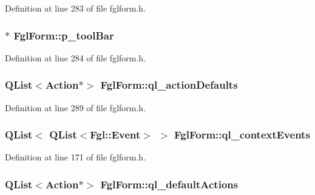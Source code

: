 Definition at line 283 of file fglform.h.

\hypertarget{classFglForm_a63ee680575b50bd02473649cd3d272f5}{
\subsubsection[{p\_\-toolBar}]{$\ast$ {\bf FglForm::p\_\-toolBar}}}
\label{classFglForm_a63ee680575b50bd02473649cd3d272f5}


Definition at line 284 of file fglform.h.

\hypertarget{classFglForm_a6b78dae39bcab3791a9acc99a3b8248d}{
\subsubsection[{ql\_\-actionDefaults}]{\setlength{\rightskip}{0pt plus 5cm}QList$<${\bf Action}$\ast$$>$ {\bf FglForm::ql\_\-actionDefaults}}}
\label{classFglForm_a6b78dae39bcab3791a9acc99a3b8248d}


Definition at line 289 of file fglform.h.

\hypertarget{classFglForm_ac7920cda2f9ebef4076ff19e73cfa047}{
\subsubsection[{ql\_\-contextEvents}]{\setlength{\rightskip}{0pt plus 5cm}QList$<$ QList$<${\bf Fgl::Event}$>$ $>$ {\bf FglForm::ql\_\-contextEvents}}}
\label{classFglForm_ac7920cda2f9ebef4076ff19e73cfa047}


Definition at line 171 of file fglform.h.

\hypertarget{classFglForm_acc7f6b6c7b13cf1e6e39bfdeba18ddc1}{
\subsubsection[{ql\_\-defaultActions}]{\setlength{\rightskip}{0pt plus 5cm}QList$<${\bf Action}$\ast$$>$ {\bf FglForm::ql\_\-defaultActions}}}
\label{classFglForm_acc7f6b6c7b13cf1e6e39bfdeba18ddc1}


